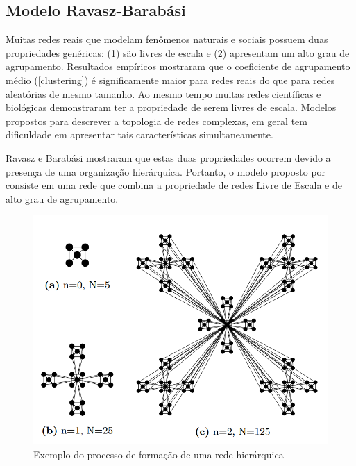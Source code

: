 \subsection{Modelo Ravasz-Barabási}

Muitas redes reais que modelam fenômenos naturais e sociais possuem duas propriedades genéricas: (1) são livres de escala e (2) apresentam um alto grau de agrupamento. Resultados empíricos mostraram que o coeficiente de agrupamento médio (\ref{clustering}) é significamente maior para redes reais do que para redes aleatórias de mesmo tamanho. Ao mesmo tempo muitas redes científicas e biológicas demonstraram ter a propriedade de serem livres de escala. Modelos propostos para descrever a topologia de redes complexas, em geral tem dificuldade em apresentar tais características simultaneamente.

Ravasz e Barabási \cite{ravasz2003hierarchical} mostraram que estas duas propriedades ocorrem devido a presença de uma organização hierárquica. Portanto, o modelo proposto por \cite{ravasz2003hierarchical} consiste em uma rede que combina a propriedade de redes Livre de Escala e de alto grau de agrupamento.

\begin{figure}[!htb]
\centering
\includegraphics[scale=0.4]{./imagens/graph_h.png}
\caption{Exemplo do processo de formação de uma rede hierárquica \cite{ravasz2003hierarchical}} 
\label{graph_h}
\end{figure}


